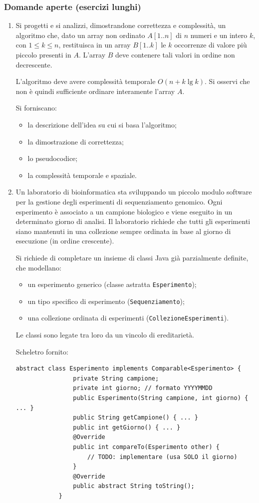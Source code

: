 	\subsubsection{Domande aperte (esercizi lunghi)}
	
	\begin{enumerate}
		\item Si progetti e si analizzi, dimostrandone correttezza e complessità, un algoritmo che, dato un array non ordinato $A[1..n]$ di $n$ numeri e un intero $k$, con $1\le k\le n$, restituisca in un array $B[1..k]$ le $k$ occorrenze di valore più piccolo presenti in $A$. L'array $B$ deve contenere tali valori in ordine non decrescente.
		
		L'algoritmo deve avere complessità temporale $O(n+k\lg k)$. Si osservi che non è quindi sufficiente ordinare interamente l'array $A$.
		
		Si forniscano:
		\begin{itemize}
			\item la descrizione dell'idea su cui si basa l'algoritmo;
			\item la dimostrazione di correttezza;
			\item lo pseudocodice;
			\item la complessità temporale e spaziale.
		\end{itemize}
		
		\item Un laboratorio di bioinformatica sta sviluppando un piccolo modulo software per la gestione degli esperimenti di sequenziamento genomico. Ogni esperimento è associato a un campione biologico e viene eseguito in un determinato giorno di analisi. Il laboratorio richiede che tutti gli esperimenti siano mantenuti in una collezione sempre ordinata in base al giorno di esecuzione (in ordine crescente).
		
		Si richiede di completare un insieme di classi Java già parzialmente definite, che modellano:
		\begin{itemize}
			\item un esperimento generico (classe astratta \texttt{Esperimento});
			\item un tipo specifico di esperimento (\texttt{Sequenziamento});
			\item una collezione ordinata di esperimenti (\texttt{CollezioneEsperimenti}).
		\end{itemize}
		Le classi sono legate tra loro da un vincolo di ereditarietà.
		
		Scheletro fornito:
		\begin{lstlisting}[style=java]
			abstract class Esperimento implements Comparable<Esperimento> {
				private String campione;
				private int giorno; // formato YYYYMMDD
				public Esperimento(String campione, int giorno) { ... }
				public String getCampione() { ... }
				public int getGiorno() { ... }
				@Override
				public int compareTo(Esperimento other) {
					// TODO: implementare (usa SOLO il giorno)
				}
				@Override
				public abstract String toString();
			}
			

\end{lstlisting}
\end{enumerate}
